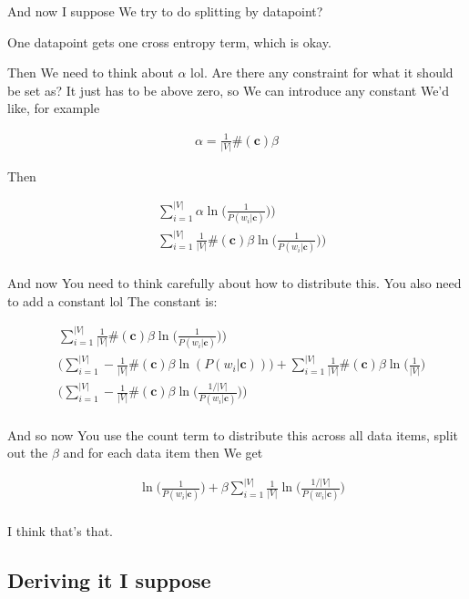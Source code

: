 \documentclass{article}
\newcommand{\context}{\boldsymbol{c}}
\begin{document}
			And now I suppose We try to do splitting by datapoint? 
			
			One datapoint gets one cross entropy term, which is okay.
			
			Then We need to think about $\alpha$ lol. Are there any constraint for what it should be set as? It just has to be above zero, so We can introduce any constant We'd like, for example
			
			\begin{align}
				\alpha = \frac{1}{|V|}\#(\context)\beta
			\end{align}
			
			Then
		
			\begin{align}
				&\sum^{|V|}_{i=1} \alpha\ln\bigg(\frac{1}{P(w_i|\context)}\bigg)\bigg)\\
				&\sum^{|V|}_{i=1} \frac{1}{|V|}\#(\context)\beta\ln\bigg(\frac{1}{P(w_i|\context)}\bigg)\bigg)\\
			\end{align}
			
			And now You need to think carefully about how to distribute this. You also need to add a constant lol The constant is:
		
			\begin{align}
				&\sum^{|V|}_{i=1} \frac{1}{|V|}\#(\context)\beta\ln\bigg(\frac{1}{P(w_i|\context)}\bigg)\bigg)\\
				&\bigg(\sum^{|V|}_{i=1} -\frac{1}{|V|}\#(\context)\beta\ln(P(w_i|\context))\bigg) + \sum^{|V|}_{i=1} \frac{1}{|V|}\#(\context)\beta\ln\bigg(\frac{1}{|V|}\bigg)\\
				&\bigg(\sum^{|V|}_{i=1} -\frac{1}{|V|}\#(\context)\beta\ln\bigg(\frac{1/|V|}{P(w_i|\context)}\bigg)\bigg)\\
			\end{align}
			
			And so now You use the count term to distribute this across all data items, split out the $\beta$ and for each data item then We get
			
			\begin{align}
				& \ln\bigg(\frac{1}{P(w_i|\context)}\bigg) + \beta\sum^{|V|}_{i=1} \frac{1}{|V|}\ln\bigg(\frac{1/|V|}{P(w_i|\context)}\bigg)\\
			\end{align}
		
			I think that's that. 
			
		
		\subsection{Deriving it I suppose}
		
\end{document}
